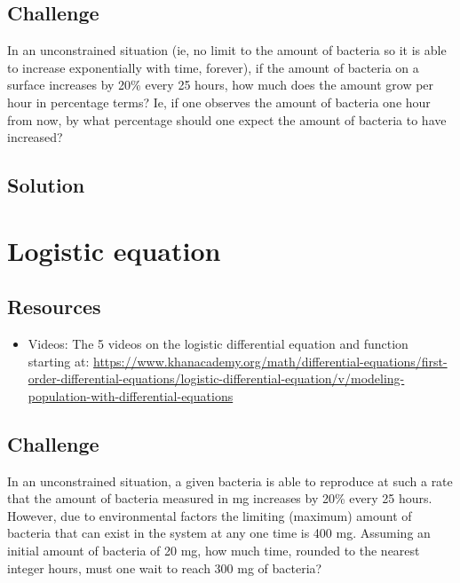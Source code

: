 \subsection*{Challenge}
In an unconstrained situation (ie, no limit to the amount of bacteria so it is able to increase exponentially with time, forever), if the amount of bacteria on a surface increases by 20\% every 25 hours, how much does the amount grow per hour in percentage terms? Ie, if one observes the amount of bacteria one hour from now, by what percentage should one expect the amount of bacteria to have increased?

\subsection*{Solution}
\six{\%}


\timebox



\newpage
\section{Logistic equation}

\subsection*{Resources}
\begin{itemize}
    \item Videos: The 5 videos on the logistic differential equation and function starting at: \url{https://www.khanacademy.org/math/differential-equations/first-order-differential-equations/logistic-differential-equation/v/modeling-population-with-differential-equations}
\end{itemize}

\subsection*{Challenge}
In an unconstrained situation, a given bacteria is able to reproduce at such a rate that the amount of bacteria measured in mg increases by 20\% every 25 hours. However, due to environmental factors the limiting (maximum) amount of bacteria that can exist in the system at any one time is 400 mg. Assuming an initial amount of bacteria of 20 mg, how much time, rounded to the nearest integer hours, must one wait to reach 300 mg of bacteria?

